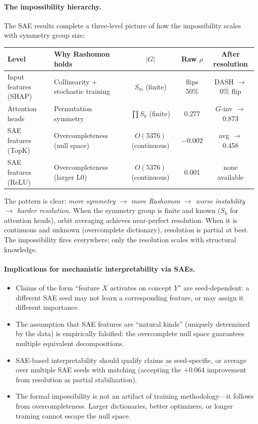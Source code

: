 \documentclass{article}
\begin{document}
\paragraph{The impossibility hierarchy.}
The SAE results complete a three-level picture of how the impossibility scales with symmetry group size:

\begin{center}
\small
\begin{tabular}{@{}llccc@{}}
\toprule
\textbf{Level} & \textbf{Why Rashomon holds} & \textbf{$|G|$} & \textbf{Raw $\rho$} & \textbf{After resolution} \\
\midrule
Input features (SHAP) & Collinearity + stochastic training & $S_m$ (finite) & flips 50\% & DASH $\to$ 0\% flip \\
Attention heads & Permutation symmetry & $\prod S_k$ (finite) & 0.277 & $G$-inv $\to$ 0.873 \\
SAE features (TopK) & Overcompleteness (null space) & $O(5376)$ (continuous) & $-0.002$ & avg $\to$ 0.458 \\
SAE features (ReLU) & Overcompleteness (larger L0) & $O(5376)$ (continuous) & 0.001 & none available \\
\bottomrule
\end{tabular}
\end{center}

The pattern is clear: \emph{more symmetry $\to$ more Rashomon $\to$ worse instability $\to$ harder resolution.} When the symmetry group is finite and known ($S_k$ for attention heads), orbit averaging achieves near-perfect resolution. When it is continuous and unknown (overcomplete dictionary), resolution is partial at best. The impossibility fires everywhere; only the resolution scales with structural knowledge.

\paragraph{Implications for mechanistic interpretability via SAEs.}
\begin{itemize}
\item Claims of the form ``feature $X$ activates on concept $Y$'' are seed-dependent: a different SAE seed may not learn a corresponding feature, or may assign it different importance.
\item The assumption that SAE features are ``natural kinds'' (uniquely determined by the data) is empirically falsified: the overcomplete null space guarantees multiple equivalent decompositions.
\item SAE-based interpretability should qualify claims as seed-specific, or average over multiple SAE seeds with matching (accepting the $+0.064$ improvement from resolution as partial stabilization).
\item The formal impossibility is not an artifact of training methodology---it follows from overcompleteness. Larger dictionaries, better optimizers, or longer training cannot escape the null space.
\end{itemize}
\end{document}
